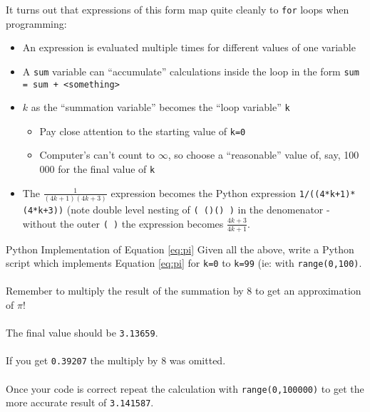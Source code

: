 \documentclass{lab}
\begin{document}
It turns out that expressions of this form map quite cleanly to \texttt{for} loops when programming:

\begin{itemize}
\item An expression is evaluated multiple times for different values of one variable
\item A \texttt{sum} variable can ``accumulate'' calculations inside the loop in the form \texttt{sum = sum + <something>}
\item $k$ as the ``summation variable'' becomes the ``loop variable'' \texttt{k}
	\begin{itemize}
		\item Pay close attention to the starting value of \texttt{k=0}
		\item Computer's can't count to $\infty$, so choose a ``reasonable'' value of, say, 100 000 for the final value of \texttt{k}
	\end{itemize}
\item The $\frac{1}{(4k+1)(4k+3)}$ expression becomes the Python expression \texttt{1/((4*k+1)*(4*k+3))} (note double level nesting of \texttt{( ()() )} in the denomenator - without the outer \texttt{( )} the expression becomes $\frac{4k+3}{4k+1}$.
\end{itemize}

\begin{task}{Python Implementation of Equation \ref{eq:pi}}{}
Given all the above, write a Python script which implements Equation \ref{eq:pi} for \texttt{k=0} to \texttt{k=99} (ie: with \texttt{range(0,100)}.
\\~\\
Remember to multiply the result of the summation by 8 to get an approximation of $\pi$!
\\~\\
The final value should be \texttt{3.13659}.
\\~\\
If you get \texttt{0.39207} the multiply by 8 was omitted.
\\~\\
Once your code is correct repeat the calculation with \texttt{range(0,100000)} to get the more accurate result of \texttt{3.141587}.
\end{task}

\pagebreak
\end{document}
